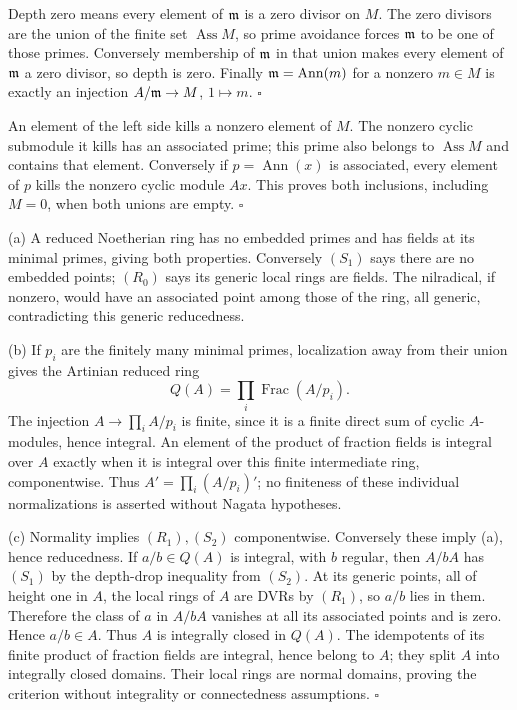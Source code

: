\documentclass[11pt]{article}
\let\chapterexercise\exercise
\renewcommand{\exercise}[2]{\Needspace{8\baselineskip}\chapterexercise{#1}{#2}}
\begin{document}
\pf
Depth zero means every element of $\mathfrak m$ is a zero divisor on $M$. The zero divisors are the union of the finite set $\operatorname{Ass}M$, so prime avoidance forces $\mathfrak m$ to be one of those primes. Conversely membership of $\mathfrak m$ in that union makes every element of $\mathfrak m$ a zero divisor, so depth is zero. Finally $\mathfrak m=\operatorname{Ann}(m)$ for a nonzero $m\in M$ is exactly an injection $A/\mathfrak m\to M$, $1\mapsto m$. \hfill$\square$

\pf
An element of the left side kills a nonzero element of $M$. The nonzero cyclic submodule it kills has an associated prime; this prime also belongs to $\operatorname{Ass}M$ and contains that element. Conversely if $p=\operatorname{Ann}(x)$ is associated, every element of $p$ kills the nonzero cyclic module $Ax$. This proves both inclusions, including $M=0$, when both unions are empty. \hfill$\square$

\pf
(a) A reduced Noetherian ring has no embedded primes and has fields at its minimal primes, giving both properties. Conversely $(S_1)$ says there are no embedded points; $(R_0)$ says its generic local rings are fields. The nilradical, if nonzero, would have an associated point among those of the ring, all generic, contradicting this generic reducedness.

(b) If $p_i$ are the finitely many minimal primes, localization away from their union gives the Artinian reduced ring
\[ Q(A)=\prod_i\operatorname{Frac}(A/p_i). \]
The injection $A\to\prod_i A/p_i$ is finite, since it is a finite direct sum of cyclic $A$-modules, hence integral. An element of the product of fraction fields is integral over $A$ exactly when it is integral over this finite intermediate ring, componentwise. Thus $A'=\prod_i(A/p_i)'$; no finiteness of these individual normalizations is asserted without Nagata hypotheses.

(c) Normality implies $(R_1),(S_2)$ componentwise. Conversely these imply (a), hence reducedness. If $a/b\in Q(A)$ is integral, with $b$ regular, then $A/bA$ has $(S_1)$ by the depth-drop inequality from $(S_2)$. At its generic points, all of height one in $A$, the local rings of $A$ are DVRs by $(R_1)$, so $a/b$ lies in them. Therefore the class of $a$ in $A/bA$ vanishes at all its associated points and is zero. Hence $a/b\in A$. Thus $A$ is integrally closed in $Q(A)$. The idempotents of its finite product of fraction fields are integral, hence belong to $A$; they split $A$ into integrally closed domains. Their local rings are normal domains, proving the criterion without integrality or connectedness assumptions. \hfill$\square$
\end{document}
